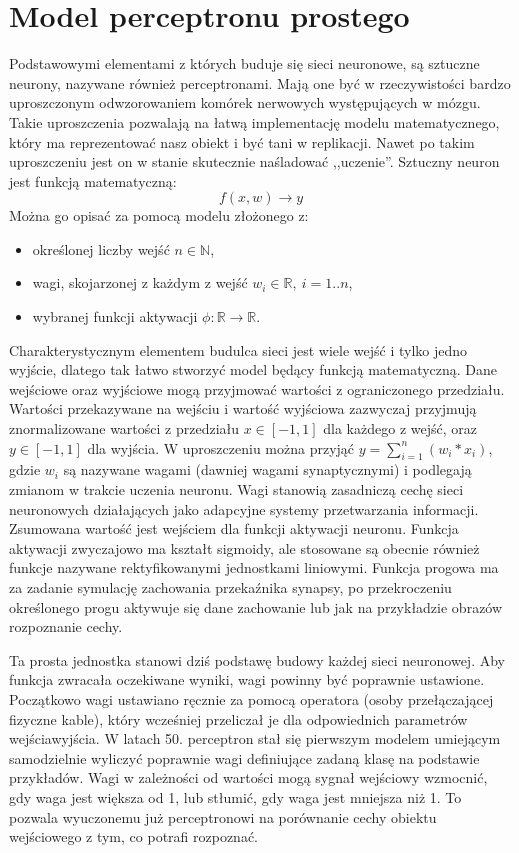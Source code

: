 \documentclass[12pt,a4paper,twoside,titlepage,openright]{book}
\begin{document}
\section{Model perceptronu prostego}
Podstawowymi elementami z których buduje się sieci neuronowe, są sztuczne neurony, nazywane również perceptronami. Mają one być w rzeczywistości bardzo uproszczonym odwzorowaniem komórek nerwowych występujących w mózgu. Takie uproszczenia pozwalają na łatwą implementację modelu matematycznego, który ma reprezentować nasz obiekt i być tani w replikacji. Nawet po takim uproszczeniu jest on w stanie skutecznie naśladować ,,uczenie''.
Sztuczny neuron jest funkcją matematyczną: $$f(x,w) \to y$$ Można go opisać za pomocą modelu złożonego z:
\begin{itemize}
\item określonej liczby wejść \(n \in \mathbb{N}\),
\item wagi, skojarzonej z każdym z wejść \(w_i \in \mathbb{R},~ i=1..n\),
\item wybranej funkcji aktywacji \(\phi: \mathbb{R} \to \mathbb{R} \).
\end{itemize}

Charakterystycznym elementem budulca sieci jest wiele wejść i tylko jedno wyjście, dlatego tak łatwo stworzyć model będący funkcją matematyczną.
Dane wejściowe oraz wyjściowe mogą przyjmować wartości z ograniczonego przedziału. Wartości przekazywane na wejściu i wartość wyjściowa zazwyczaj przyjmują znormalizowane wartości z przedziału \(x \in [-1, 1]\) dla każdego z wejść, oraz \(y \in [-1,1]\) dla wyjścia. W uproszczeniu można przyjąć \(y = \sum\limits_{i=1}^n (w_i * x_i)\), gdzie \(w_i\) są nazywane wagami (dawniej wagami synaptycznymi) i podlegają zmianom w trakcie uczenia neuronu. Wagi stanowią zasadniczą cechę sieci neuronowych działających jako adapcyjne systemy przetwarzania informacji. Zsumowana wartość jest wejściem dla funkcji aktywacji neuronu. Funkcja aktywacji zwyczajowo ma kształt sigmoidy, ale stosowane są obecnie również funkcje nazywane rektyfikowanymi jednostkami liniowymi. Funkcja progowa ma za zadanie symulację zachowania przekaźnika synapsy, po przekroczeniu określonego progu aktywuje się dane zachowanie lub jak na przykładzie obrazów rozpoznanie cechy.

Ta prosta jednostka stanowi dziś podstawę budowy każdej sieci neuronowej. Aby funkcja zwracała oczekiwane wyniki, wagi powinny być poprawnie ustawione. Początkowo wagi ustawiano ręcznie za pomocą operatora (osoby przełączającej fizyczne kable), który wcześniej przeliczał je dla odpowiednich parametrów wejścia\/wyjścia. W latach 50. perceptron stał się pierwszym modelem umiejącym samodzielnie wyliczyć poprawnie wagi definiujące zadaną klasę na podstawie przykładów. Wagi w zależności od wartości mogą sygnał wejściowy wzmocnić, gdy waga jest większa od 1, lub stłumić, gdy waga jest mniejsza niż 1. To pozwala wyuczonemu już perceptronowi na porównanie cechy obiektu wejściowego z tym, co potrafi rozpoznać.
\end{document}
